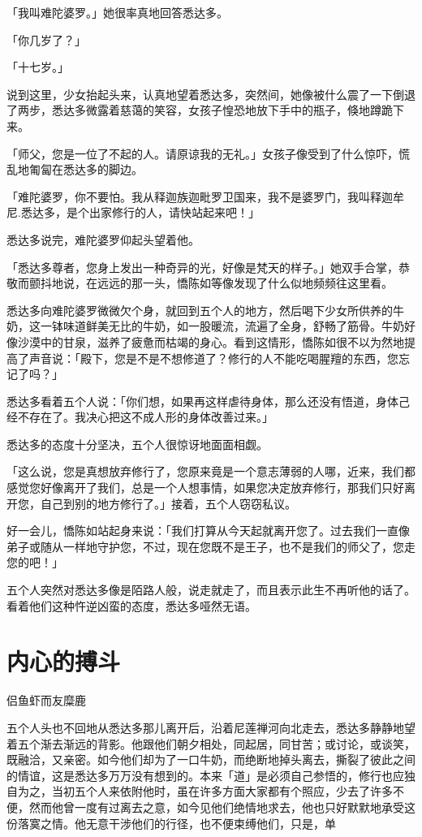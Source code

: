 \documentclass[12pt,twoside,openany]{book}
\begin{document}
「我叫难陀婆罗。」她很率真地回答悉达多。

「你几岁了？」

「十七岁。」

说到这里，少女抬起头来，认真地望着悉达多，突然间，她像被什么震了一下倒退了两步，悉达多微露着慈蔼的笑容，女孩子惶恐地放下手中的瓶子，倏地蹲跪下来。

「师父，您是一位了不起的人。请原谅我的无礼。」女孩子像受到了什么惊吓，慌乱地匍匐在悉达多的脚边。

「难陀婆罗，你不要怕。我从释迦族迦毗罗卫国来，我不是婆罗门，我叫释迦牟尼.悉达多，是个出家修行的人，请快站起来吧！」

悉达多说完，难陀婆罗仰起头望着他。

「悉达多尊者，您身上发出一种奇异的光，好像是梵天的样子。」她双手合掌，恭敬而颤抖地说，在远远的那一头，憍陈如等像发现了什么似地频频往这里看。

悉达多向难陀婆罗微微欠个身，就回到五个人的地方，然后喝下少女所供养的牛奶，这一钵味道鲜美无比的牛奶，如一股暖流，流遍了全身，舒畅了筋骨。牛奶好像沙漠中的甘泉，滋养了疲惫而枯竭的身心。看到这情形，憍陈如很不以为然地提高了声音说：「殿下，您是不是不想修道了？修行的人不能吃喝腥羶的东西，您忘记了吗？」

悉达多看着五个人说：「你们想，如果再这样虐待身体，那么还没有悟道，身体己经不存在了。我决心把这不成人形的身体改善过来。」

悉达多的态度十分坚决，五个人很惊讶地面面相觑。

「这么说，您是真想放弃修行了，您原来竟是一个意志薄弱的人哪，近来，我们都感觉您好像离开了我们，总是一个人想事情，如果您决定放弃修行，那我们只好离开您，自己到别的地方修行了。」接着，五个人窃窃私议。

好一会儿，憍陈如站起身来说：「我们打算从今天起就离开您了。过去我们一直像弟子或随从一样地守护您，不过，现在您既不是王子，也不是我们的师父了，您走您的吧！」

五个人突然对悉达多像是陌路人般，说走就走了，而且表示此生不再听他的话了。看着他们这种忤逆凶蛮的态度，悉达多哑然无语。

\section{内心的搏斗}\label{sec1.10}

侣鱼虾而友糜鹿

五个人头也不回地从悉达多那儿离开后，沿着尼莲禅河向北走去，悉达多静静地望着五个渐去渐远的背影。他跟他们朝夕相处，同起居，同甘苦；或讨论，或谈笑，既融洽，又亲密。如今他们却为了一口牛奶，而绝断地掉头离去，撕裂了彼此之间的情谊，这是悉达多万万没有想到的。本来「道」是必须自己参悟的，修行也应独自为之，当初五个人来依附他时，虽在许多方面大家都有个照应，少去了许多不便，然而他曾一度有过离去之意，如今见他们绝情地求去，他也只好默默地承受这份落寞之情。他无意干涉他们的行径，也不便束缚他们，只是，单
\end{document}

